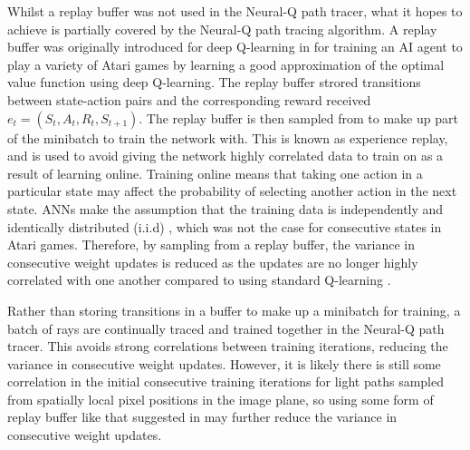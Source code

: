 \documentclass[../dissertation.tex]{subfiles}
\begin{document}
Whilst a replay buffer was not used in the Neural-Q path tracer, what it hopes to achieve is partially covered by the Neural-Q path tracing algorithm. A replay buffer was originally introduced for deep Q-learning in \cite{mnih2013playing} for training an AI agent to play a variety of Atari games by learning a good approximation of the optimal value function using deep Q-learning. The replay buffer strored transitions between state-action pairs and the corresponding reward received $e_t = (S_t, A_t, R_t, S_{t+1})$. The replay buffer is then sampled from to make up part of the minibatch to train the network with. This is known as experience replay, and is used to avoid giving the network highly correlated data to train on as a result of learning online. Training online means that taking one action in a particular state may affect the probability of selecting another action in the next state. ANNs make the assumption that the training data is independently and identically distributed (i.i.d) \cite{sutton2011reinforcement}, which was not the case for consecutive states in Atari games. Therefore, by sampling from a replay buffer, the variance in consecutive weight updates is reduced as the updates are no longer highly correlated with one another compared to using standard Q-learning \cite{sutton2011reinforcement}. 

Rather than storing transitions in a buffer to make up a minibatch for training, a batch of rays are continually traced and trained together in the Neural-Q path tracer. This avoids strong correlations between training iterations, reducing the variance in consecutive weight updates. However, it is likely there is still some correlation in the initial consecutive training iterations for light paths sampled from spatially local pixel positions in the image plane, so using some form of replay buffer like that suggested in \cite{muller2018neural} may further reduce the variance in consecutive weight updates.
\end{document}
